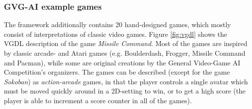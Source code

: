 \documentclass[a4paper,titlepage,final]{report}
\begin{document}
\subsubsection*{GVG-AI example games}
The framework additionally contains 20 hand-designed games, which mostly consist of interpretations of classic video games. Figure \ref{fig:vgdl} shows the VGDL description of the game \emph{Missile Command}.
Most of the games are inspired by classic arcade- and Atari games (e.g. Boulderdash, Frogger, Missile Command and Pacman), while some are original creations by the General Video-Game AI Competition's organizers. 
The games can be described (except for the game \emph{Sokoban}) as \textit{action-arcade} games, in that the player controls a single avatar which must be moved quickly around in a 2D-setting to win, or to get a high score (the player is able to increment a score  counter in all of the games).
\end{document}

